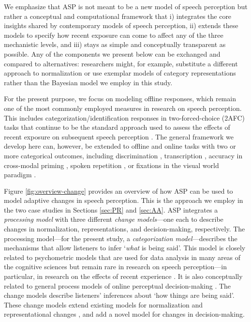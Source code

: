 \documentclass[
  11pt,
  man,floatsintext]{apa6}
\begin{document}
We emphasize that ASP is not meant to be a new model of speech perception but rather a conceptual and computational framework that i) integrates the core insights shared by contemporary models of speech perception, ii) extends these models to specify how recent exposure can come to affect any of the three mechanistic levels, and iii) stays as simple and conceptually transparent as possible. Any of the components we present below can be exchanged and compared to alternatives: researchers might, for example, substitute a different approach to normalization or use exemplar models of category representations rather than the Bayesian model we employ in this study.

For the present purpose, we focus on modeling offline responses, which remain one of the most commonly employed measures in research on speech perception. This includes categorization/identification responses in two-forced-choice (2AFC) tasks that continue to be the standard approach used to assess the effects of recent exposure on subsequent speech perception \autocites[e.g.,][]{norris2003,kraljic-samuel2006,vroomen2007,reinisch-holt2013,drouin2016,liu-jaeger2018,zheng-samuel2020,clayards2008,maye2008,kleinschmidt2015,xie2017}. The general framework we develop here can, however, be extended to offline and online tasks with two or more categorical outcomes, including discrimination \autocites[e.g.,][]{feldman2009,richter2017}, transcription \autocite[e.g.,][]{bradlow-bent2008}, accuracy in cross-modal priming \autocites[e.g.,][]{eisner2013,sjerps-mcqueen2010}, spoken repetition \autocite[e.g.,][]{bieber2021}, or fixations in the visual world paradigm \autocites[e.g.,][]{hanulikova-weber2012,nixon2016}.

Figure \ref{fig:overview-change} provides an overview of how ASP can be used to model adaptive changes in speech perception. This is the approach we employ in the two case studies in Sections \ref{sec:PR} and \ref{sec:AA}. ASP integrates a \emph{processing model} with three different \emph{change models}---one each to describe changes in normalization, representations, and decision-making, respectively. The processing model---for the present study, a \emph{categorization model}---describes the mechanisms that allow listeners to infer `\emph{what} is being said'. This model is closely related to psychometric models that are used for data analysis in many areas of the cognitive sciences \autocite[for an introduction, see][]{wichmann-hill2001} but remain rare in research on speech perception---in particular, in research on the effects of recent experience \autocites[but see][]{clayards2008,kleinschmidt-jaeger2016cogsci}. It is also conceptually related to general process models of online perceptual decision-making \autocite[e.g., the drift diffusion model,][]{ratcliff2011}. The change models describe listeners' inferences about `how things are being said'. These change models extend existing models for normalization \autocite[adding \emph{inference} of talker's means to C-CuRE,][]{mcmurray-jongman2011} and representational changes \autocite[extending ideal adaptors to multivariate acoustic inputs,][]{kleinschmidt-jaeger2015}, and add a novel model for changes in decision-making.
\end{document}
